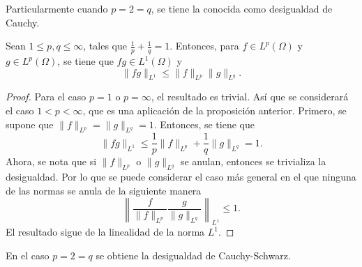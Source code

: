 Particularmente cuando $p=2=q$, se tiene la conocida como desigualdad de
Cauchy. 
\begin{proposition}
    Sean $1\leq p, q\leq \infty$, tales que $\frac{1}{p} + \frac{1}{q} = 1$.
    Entonces, para $f\in L^p(\Omega)$ y $g\in L^p(\Omega)$, se tiene
    que $fg \in L^1(\Omega)$ y 
    \begin{equation*}
        \|fg\|_{L^1} \leq \|f\|_{L^p}\|g\|_
        {L^q}.
    \end{equation*}
\end{proposition}
\begin{proof}
    Para el caso $p=1$ o $p=\infty$, el resultado es trivial. Así que 
    se considerará el caso $1<p<\infty$, que es una aplicación 
    de la proposición anterior. Primero, se supone
    que $\|f\|_{L^p} = \|g\|_{L^q} = 1$. Entonces, 
    se tiene que
    \begin{equation*}
        \|fg\|_{L^1} \leq \frac{1}{p}\|f\|_{L^p} + \frac{1}{q}\|g\|_{L^q} 
        = 1.
    \end{equation*}
    Ahora, se nota que si $\|f\|_{L^p}$ o $\|g\|_{L^q}$ se anulan, 
    entonces se trivializa la desigualdad. 
    Por lo que se puede considerar el caso más general en el que ninguna de las
    normas se anula de la siguiente manera
    \begin{equation*}
        \left\| \frac{f}{\|f\|_{L^p}} \frac{g}{\|g\|_{L^q}}
        \right\|_{L^1} \leq 1.
    \end{equation*}
    El resultado sigue de la linealidad de la norma $L^1$.
\end{proof}
En el caso $p=2=q$ se obtiene la desigualdad de Cauchy-Schwarz.

